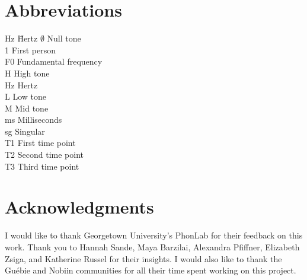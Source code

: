 \documentclass[output=paper]{langscibook}
\begin{document}
\section*{Abbreviations}
\begin{multicols}{2}\raggedcolumns
\begin{tabbing}
Hz\hspace{1ex} \= Hertz\kill
$\emptyset$ \> Null tone \\
1 \> First person \\
F0 \> Fundamental frequency  \\
H \> High tone  \\ 
Hz \> Hertz \\
L \> Low tone \\ 
M \> Mid tone \\
ms \> Milliseconds\\
sg \> Singular \\
T1 \> First time point \\
T2 \> Second time point \\
T3 \> Third time point\\
\end{tabbing}
\end{multicols}

\section*{Acknowledgments}
I would like to thank Georgetown University's PhonLab for their feedback on this work. Thank you to Hannah Sande, Maya Barzilai, Alexandra Pfiffner, Elizabeth Zsiga, and Katherine Russel for their insights. I would also like to thank the Guébie and Nobiin communities for all their time spent working on this project.


{\sloppy\printbibliography[heading=subbibliography,notkeyword=this]}
\end{document}
